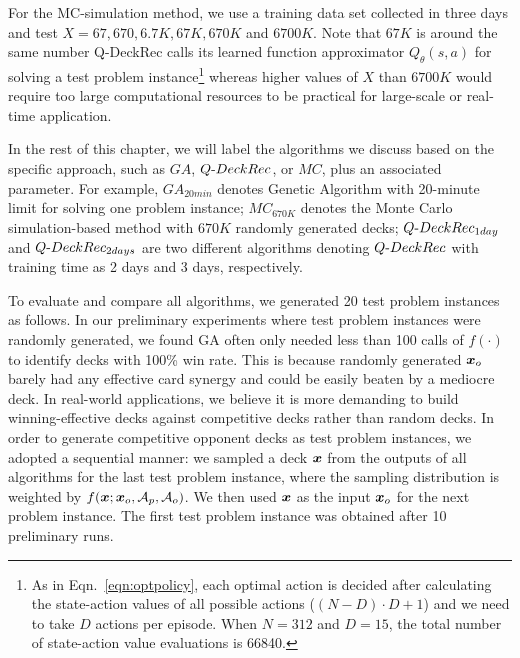 For the MC-simulation method, we use a training data set collected in three days and test ${X=67, 670, 6.7K, 67K, 670K}$ and $6700K$. Note that $67K$ is around the same number Q-DeckRec calls its learned function approximator $Q_\theta(s,a)$ for solving a test problem instance\footnote{As in Eqn.~\ref{eqn:optpolicy}, each optimal action is decided after calculating the state-action values of all possible actions ($(N-D)\cdot D + 1$) and we need to take $D$ actions per episode. When $N=312$ and $D=15$, the total number of state-action value evaluations is 66840.} whereas higher values of $X$ than $6700K$ would require too large computational resources to be practical for large-scale or real-time application. 


In the rest of this chapter, we will label the algorithms we discuss based on the specific approach, such as $GA$, $Q\textnormal{-}DeckRec$, or $MC$, plus an associated parameter. For example, $GA_{20min}$ denotes Genetic Algorithm with 20-minute limit for solving one problem instance; $MC_{670K}$ denotes the Monte Carlo simulation-based method with $670K$ randomly generated decks; $Q\textnormal{-}DeckRec_{1day}$ and $Q\textnormal{-}DeckRec_{2days}$ are two different algorithms denoting $Q\textnormal{-}DeckRec$ with training time as 2 days and 3 days, respectively.   

To evaluate and compare all algorithms, we generated 20 test problem instances as follows. In our preliminary experiments where test problem instances were randomly generated, we found GA often only needed less than 100 calls of $f(\cdot)$ to identify decks with 100\% win rate. This is because randomly generated $\boldsymbol{x}_o$ barely had any effective card synergy and could be easily beaten by a mediocre deck. In real-world applications, we believe it is more demanding to build winning-effective decks against competitive decks rather than random decks. In order to generate competitive opponent decks as test problem instances, we adopted a sequential manner: we sampled a deck $\boldsymbol{x}$ from the outputs of all algorithms for the last test problem instance, where the sampling distribution is weighted by $f(\boldsymbol{x};\boldsymbol{x}_o, \mathcal{A}_p, \mathcal{A}_o)$. We then used $\boldsymbol{x}$ as the input $\boldsymbol{x}_o$ for the next problem instance. The first test problem instance was obtained after 10 preliminary runs. 

